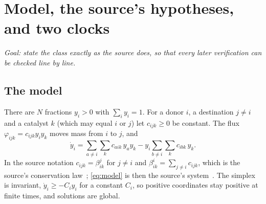 \documentclass[11pt,a4paper]{article}
\theoremstyle{definition}\newtheorem{definition}[theorem]{Definition}
\theoremstyle{remark}\newtheorem{remark}[theorem]{Remark}
\begin{document}
\section{Model, the source's hypotheses, and two clocks}
\label{sec:model}

\emph{Goal: state the class exactly as the source does, so that every
later verification can be checked line by line.}

\subsection{The model}
There are $N$ fractions $y_i>0$ with $\sum_iy_i=1$. For a donor $i$, a
destination $j\ne i$ and a catalyst $k$ (which may equal $i$ or $j$) let
$c_{ijk}\ge0$ be constant. The flux $\varphi_{ijk}=c_{ijk}y_iy_k$ moves
mass from $i$ to $j$, and
\begin{equation}
\dot y_i=\sum_{a\ne i}\sum_{k}c_{aik}\,y_ay_k
        -y_i\sum_{b\ne i}\sum_kc_{ibk}\,y_k .
\label{eq:model}
\end{equation}
In the source notation $c_{ijk}=\beta^j_{ik}$ for $j\ne i$ and
$\beta^i_{ik}=\sum_{j\ne i}c_{ijk}$, which is the source's conservation
law~\cite[eq.~(2), p.~7]{CCM}; \eqref{eq:model} is then the source's
system~\cite[eqs.~(1)--(4), pp.~6--7]{CCM}. The simplex is invariant,
$\dot y_i\ge-C_iy_i$ for a constant $C_i$, so positive coordinates stay
positive at finite times, and solutions are global.
\end{document}
